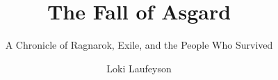 \title{The Fall of Asgard}
\subtitle{A Chronicle of Ragnarok, Exile, and the People Who Survived}

\author{
     \and
    Loki Laufeyson
}


\date{}
